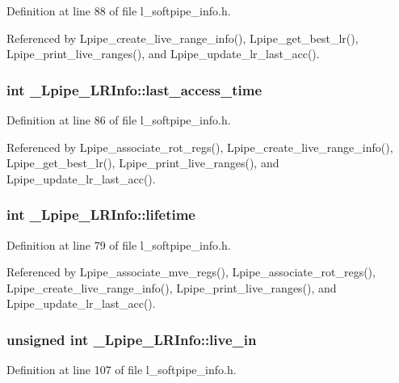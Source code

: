 Definition at line 88 of file l\_\-softpipe\_\-info.h.

Referenced by Lpipe\_\-create\_\-live\_\-range\_\-info(), Lpipe\_\-get\_\-best\_\-lr(), Lpipe\_\-print\_\-live\_\-ranges(), and Lpipe\_\-update\_\-lr\_\-last\_\-acc().
\subsubsection{\setlength{\rightskip}{0pt plus 5cm}int \bf{\_\-Lpipe\_\-LRInfo::last\_\-access\_\-time}}\label{struct__Lpipe__LRInfo_422c27c3653ac5bfa836ec2c62f0917b}




Definition at line 86 of file l\_\-softpipe\_\-info.h.

Referenced by Lpipe\_\-associate\_\-rot\_\-regs(), Lpipe\_\-create\_\-live\_\-range\_\-info(), Lpipe\_\-get\_\-best\_\-lr(), Lpipe\_\-print\_\-live\_\-ranges(), and Lpipe\_\-update\_\-lr\_\-last\_\-acc().
\subsubsection{\setlength{\rightskip}{0pt plus 5cm}int \bf{\_\-Lpipe\_\-LRInfo::lifetime}}\label{struct__Lpipe__LRInfo_5b6749fd6504e56ea29c985224fa6731}




Definition at line 79 of file l\_\-softpipe\_\-info.h.

Referenced by Lpipe\_\-associate\_\-mve\_\-regs(), Lpipe\_\-associate\_\-rot\_\-regs(), Lpipe\_\-create\_\-live\_\-range\_\-info(), Lpipe\_\-print\_\-live\_\-ranges(), and Lpipe\_\-update\_\-lr\_\-last\_\-acc().
\subsubsection{\setlength{\rightskip}{0pt plus 5cm}unsigned int \bf{\_\-Lpipe\_\-LRInfo::live\_\-in}}\label{struct__Lpipe__LRInfo_848c52472b8515b66f534300612b2b31}




Definition at line 107 of file l\_\-softpipe\_\-info.h.

